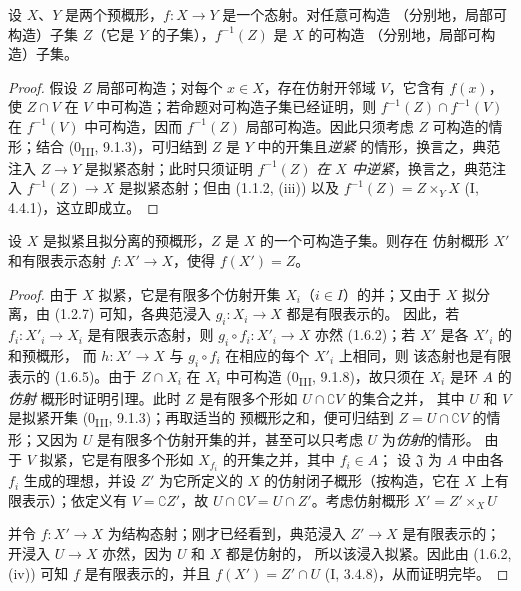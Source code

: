 \begin{proposition}[1.8.2]
\label{IV.1.8.2-fr}
设 $X$、$Y$ 是两个预概形，$f:X\to Y$ 是一个态射。对任意可构造
（分别地，局部可构造）子集 $Z$（它是 $Y$ 的子集），$f^{-1}(Z)$ 是 $X$ 的可构造
（分别地，局部可构造）子集。
\end{proposition}

\begin{proof}
假设 $Z$ 局部可构造；对每个 $x\in X$，存在仿射开邻域 $V$，它含有 $f(x)$，
使 $Z\cap V$ 在 $V$ 中可构造；若命题对可构造子集已经证明，则
$f^{-1}(Z)\cap f^{-1}(V)$ 在 $f^{-1}(V)$ 中可构造，因而 $f^{-1}(Z)$
局部可构造。因此只须考虑 $Z$ 可构造的情形；结合
(0\textsubscript{III}, 9.1.3)，可归结到 $Z$ 是 $Y$ 中的开集且\emph{逆紧}
的情形，换言之，典范注入 $Z\to Y$ 是拟紧态射；此时只须证明
$f^{-1}(Z)$ \emph{在 $X$ 中逆紧}，换言之，典范注入
$f^{-1}(Z)\to X$ 是拟紧态射；但由 (1.1.2, (iii)) 以及
$f^{-1}(Z)=Z\times_YX$ (I, 4.4.1)，这立即成立。
\end{proof}

\begin{lemma}[1.8.3]
\label{IV.1.8.3-fr}
设 $X$ 是拟紧且拟分离的预概形，$Z$ 是 $X$ 的一个可构造子集。则存在
仿射概形 $X'$ 和有限表示态射 $f:X'\to X$，使得 $f(X')=Z$。
\end{lemma}

\begin{proof}
由于 $X$ 拟紧，它是有限多个仿射开集 $X_i$（$i\in I$）的并；又由于
$X$ 拟分离，由 (1.2.7) 可知，各典范浸入 $g_i:X_i\to X$ 都是有限表示的。
因此，若 $f_i:X'_i\to X_i$ 是有限表示态射，则
$g_i\circ f_i:X'_i\to X$ 亦然 (1.6.2)；若 $X'$ 是各 $X'_i$ 的和预概形，
而 $h:X'\to X$ 与 $g_i\circ f_i$ 在相应的每个 $X'_i$ 上相同，则
该态射也是有限表示的 (1.6.5)。由于 $Z\cap X_i$ 在 $X_i$ 中可构造
(0\textsubscript{III}, 9.1.8)，故只须在 $X_i$ 是环 $A$ 的\emph{仿射}
概形时证明引理。此时 $Z$ 是有限多个形如 $U\cap\complement V$ 的集合之并，
其中 $U$ 和 $V$ 是拟紧开集 (0\textsubscript{III}, 9.1.3)；再取适当的
预概形之和，便可归结到 $Z=U\cap\complement V$ 的情形；又因为 $U$
是有限多个仿射开集的并，甚至可以只考虑 $U$ 为\emph{仿射}的情形。
由于 $V$ 拟紧，它是有限多个形如 $X_{f_i}$ 的开集之并，其中 $f_i\in A$；
设 $\mathfrak J$ 为 $A$ 中由各 $f_i$ 生成的理想，并设 $Z'$ 为它所定义的
$X$ 的仿射闭子概形（按构造，它在 $X$ 上有限表示）；依定义有
$V=\complement Z'$，故 $U\cap\complement V=U\cap Z'$。考虑仿射概形
$X'=Z'\times_XU$


并令 $f:X'\to X$ 为结构态射；刚才已经看到，典范浸入 $Z'\to X$
是有限表示的；开浸入 $U\to X$ 亦然，因为 $U$ 和 $X$ 都是仿射的，
所以该浸入拟紧。因此由 (1.6.2, (iv)) 可知 $f$ 是有限表示的，并且
$f(X')=Z'\cap U$ (I, 3.4.8)，从而证明完毕。
\end{proof}

